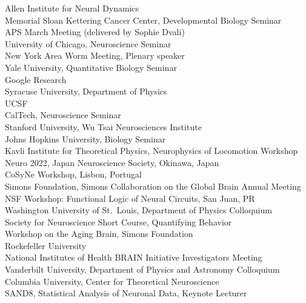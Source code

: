 \documentclass[11pt]{article}
\begin{document}
Allen Institute for Neural Dynamics \\
Memorial Sloan Kettering Cancer Center, Developmental Biology Seminar  \\
APS March Meeting (delivered by Sophie Dvali) \\
University of Chicago, Neuroscience Seminar  \\
New York Area Worm Meeting, Plenary speaker \\
Yale University, Quantitative  Biology Seminar \\
Google Research  \\
Syracuse University, Department of Physics \\
UCSF \\
CalTech, Neuroscience Seminar \\
Stanford University, Wu Tsai Neurosciences Institute \\
Johns Hopkins University, Biology Seminar \\
Kavli Institute for Theoretical Physics, Neurophysics of Locomotion Workshop  \\
Neuro 2022, Japan Neuroscience Society, Okinawa, Japan \\
CoSyNe Workshop, Lisbon, Portugal\\ 
Simons Foundation, Simons Collaboration on the Global Brain Annual Meeting \\
NSF Workshop: Functional Logic of Neural Circuits, San Juan, PR \\
Washington University of St.~Louis, Department of Physics Colloquium \\
Society for Neuroscience Short Course, Quantifying Behavior \\
Workshop on the Aging Brain, Simons Foundation \\
Rockefeller University \\
National Institutes of Health BRAIN Initiative Investigators Meeting \\
Vanderbilt University, Department of Physics and Astronomy Colloquium \\
Columbia University, Center for Theoretical Neuroscience \\
SAND8, Statistical Analysis of Neuronal Data, Keynote Lecturer \\
\end{document}
